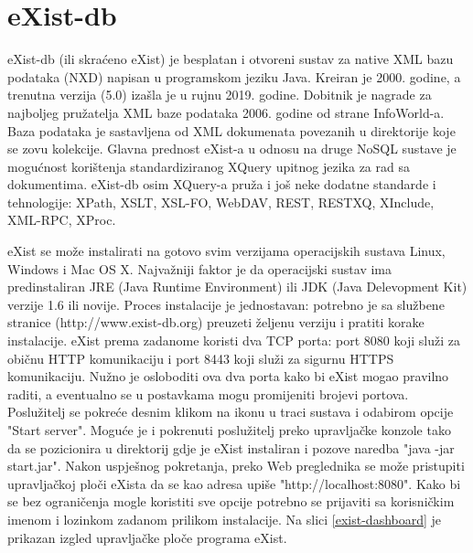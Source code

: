 \documentclass{foi}
\begin{document}
\section{eXist-db}

eXist-db (ili skraćeno eXist) je besplatan i otvoreni sustav za native XML bazu podataka (NXD) napisan u programskom jeziku Java. Kreiran je 2000. godine, a trenutna verzija (5.0) izašla je u rujnu 2019. godine. Dobitnik je nagrade za najboljeg pružatelja XML baze podataka 2006. godine od strane InfoWorld-a. Baza podataka je sastavljena od XML dokumenata povezanih u direktorije koje se zovu kolekcije. Glavna prednost eXist-a u odnosu na druge NoSQL sustave je mogućnost korištenja standardiziranog XQuery upitnog jezika za rad sa dokumentima. eXist-db osim XQuery-a pruža i još neke dodatne standarde i tehnologije: XPath, XSLT, XSL-FO, WebDAV, REST, RESTXQ, XInclude, XML-RPC, XProc. \cite{exist-definition}

eXist se može instalirati na gotovo svim verzijama operacijskih sustava Linux, Windows i Mac OS X. Najvažniji faktor je da operacijski sustav ima predinstaliran JRE (Java Runtime Environment) ili JDK (Java Delevopment Kit) verzije 1.6 ili novije. Proces instalacije je jednostavan: potrebno je sa službene stranice (http://www.exist-db.org) preuzeti željenu verziju i pratiti korake instalacije. eXist prema zadanome koristi dva TCP porta: port 8080 koji služi za običnu HTTP komunikaciju i port 8443 koji služi za sigurnu HTTPS komunikaciju. Nužno je osloboditi ova dva porta kako bi eXist mogao pravilno raditi, a eventualno se u postavkama mogu promijeniti brojevi portova. Poslužitelj se pokreće desnim klikom na ikonu u traci sustava i odabirom opcije "Start server". Moguće je i pokrenuti poslužitelj preko upravljačke konzole tako da se pozicionira u direktorij gdje je eXist instaliran i pozove naredba "java -jar start.jar". Nakon uspješnog pokretanja, preko Web preglednika se može pristupiti upravljačkoj ploči eXista da se kao adresa upiše "http://localhost:8080". Kako bi se bez ograničenja mogle koristiti sve opcije potrebno se prijaviti sa korisničkim imenom i lozinkom zadanom prilikom instalacije. Na slici \ref{exist-dashboard} je prikazan izgled upravljačke ploče programa eXist.
\end{document}
